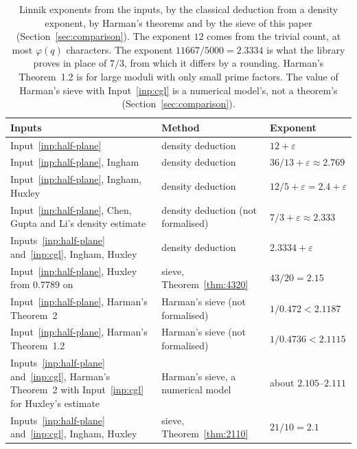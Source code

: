 \documentclass[11pt]{article}
\theoremstyle{definition}
\begin{document}
\begin{table}[t]
\centering
\small
\caption{Linnik exponents from the inputs, by the classical deduction from a density exponent, by Harman's theorems
and by the sieve of this paper (Section~\ref{sec:comparison}). The exponent $12$ comes from the trivial count, at most
$\varphi(q)$ characters. The exponent $11667/5000 = 2.3334$ is what the library proves in place of $7/3$, from which
it differs by a rounding. Harman's Theorem~1.2 \cite{harman08} is for large moduli with only small prime factors.
The value of Harman's sieve with Input~\ref{inp:cgl} is a numerical model's, not a theorem's
(Section~\ref{sec:comparison}).}
\label{tab:exponents}
\vspace{3pt}
\begin{tabular}{@{}>{\raggedright\arraybackslash}p{}>{\raggedright\arraybackslash}p{}l@{}}
\toprule
Inputs & Method & Exponent \\
\midrule
Input~\ref{inp:half-plane} & density deduction & $12 + \varepsilon$ \\
Input~\ref{inp:half-plane}, Ingham & density deduction & $36/13 + \varepsilon \approx 2.769$ \\
Input~\ref{inp:half-plane}, Ingham, Huxley & density deduction & $12/5 + \varepsilon = 2.4 + \varepsilon$ \\
Input~\ref{inp:half-plane}, Chen, Gupta and Li's density estimate \cite[Theorem~1.2]{cgl} &
  density deduction (not formalised) & $7/3 + \varepsilon \approx 2.333$ \\
Inputs~\ref{inp:half-plane} and~\ref{inp:cgl}, Ingham, Huxley & density deduction &
  $2.3334 + \varepsilon$ \\
Input~\ref{inp:half-plane}, Huxley from $0.7789$ on & sieve, Theorem~\ref{thm:4320} & $43/20 = 2.15$ \\
Input~\ref{inp:half-plane}, Harman's Theorem~2 \cite{harman05} &
  Harman's sieve (not formalised) & $1/0.472 < 2.1187$ \\
Input~\ref{inp:half-plane}, Harman's Theorem~1.2 \cite{harman08} &
  Harman's sieve (not formalised) & $1/0.4736 < 2.1115$ \\
Inputs~\ref{inp:half-plane} and~\ref{inp:cgl}, Harman's Theorem~2 with Input~\ref{inp:cgl} for Huxley's estimate &
  Harman's sieve, a numerical model & about $2.105$--$2.111$ \\
Inputs~\ref{inp:half-plane} and~\ref{inp:cgl}, Ingham, Huxley & sieve, Theorem~\ref{thm:2110} & $21/10 = 2.1$ \\
\bottomrule
\end{tabular}
\end{table}
\end{document}
